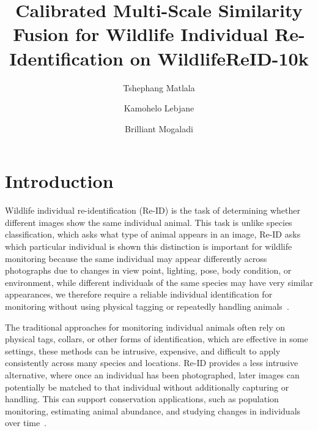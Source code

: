 \documentclass[runningheads]{llncs}
\begin{document}
%
\title{Calibrated Multi-Scale Similarity Fusion for Wildlife Individual Re-Identification on WildlifeReID-10k}
%
%
\author{Tshephang Matlala  \and
Kamohelo Lebjane  \and
Brilliant Mogaladi }
%
%
%
\maketitle
%
\begin{abstract}

\end{abstract}
%
\section{Introduction}

Wildlife individual re-identification (Re-ID) is the task of determining whether
different images show the same individual animal. This task is unlike species classification,
which asks what type of animal appears in an image, Re-ID asks which particular
individual is shown this distinction is important for wildlife monitoring
because the same individual may appear differently across photographs due to
changes in view point, lighting, pose, body condition, or environment, while
different individuals of the same species may have very similar appearances, we 
therefore require a reliable individual identification for monitoring without using physical tagging
or repeatedly handling animals~\cite{vidal2021perspectives}.

The traditional approaches for monitoring individual animals often rely on physical
tags, collars, or other forms of identification, which are effective in some
settings, these methods can be intrusive, expensive, and difficult to apply
consistently across many species and locations. Re-ID provides a
less intrusive alternative, where once an individual has been photographed, later
images can potentially be matched to that individual without additionally
capturing or handling. This can support conservation applications, such as
population monitoring, estimating animal abundance, and studying changes in
individuals over time~\cite{cermak2024wildfusion}.
\end{document}
